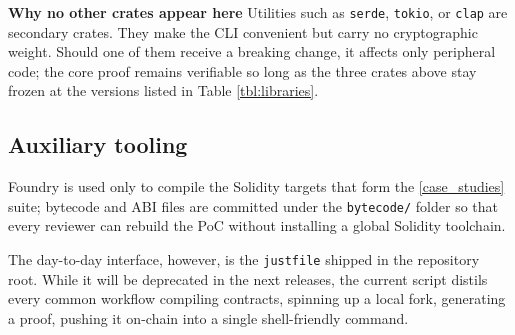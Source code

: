 

\textbf{Why no other crates appear here}  
Utilities such as \texttt{serde}, \texttt{tokio}, or \texttt{clap} are secondary crates. They make the CLI convenient but carry no cryptographic weight. Should one of them receive a breaking change, it affects only peripheral code; the core proof remains verifiable so long as the three crates above stay frozen at the versions listed in Table \ref{tbl:libraries}.


\subsection{Auxiliary tooling}  

Foundry is used only to compile the Solidity targets that form the
\ref{case_studies} suite; bytecode and ABI files are committed under the
\texttt{bytecode/} folder so that every reviewer can rebuild the PoC without
installing a global Solidity toolchain.

The day-to-day interface, however, is the \texttt{justfile} shipped in the
repository root.  While it will be deprecated in the next
releases, the current script distils every common workflow compiling contracts,
spinning up a local fork, generating a proof, pushing it on-chain into a single
shell-friendly command.

